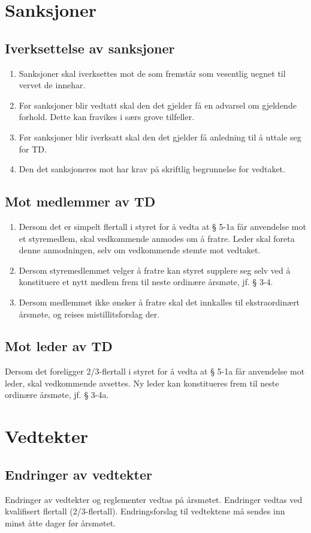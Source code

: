 \documentclass[11pt]{article}
\begin{document}
\section{Sanksjoner}
\subsection{Iverksettelse av sanksjoner}
\begin{enumerate}
	\item Sanksjoner skal iverksettes mot de som fremstår som vesentlig uegnet til vervet de innehar.
	\item Før sanksjoner blir vedtatt skal den det gjelder få en advarsel om gjeldende forhold. Dette kan fravikes i særs grove tilfeller.
	\item Før sanksjoner blir iverksatt skal den det gjelder få anledning til å uttale seg for TD.
	\item Den det sanksjoneres mot har krav på skriftlig begrunnelse for vedtaket.
\end{enumerate}

\subsection{Mot medlemmer av TD}
\begin{enumerate}
	\item Dersom det er simpelt flertall i styret for å vedta at § 5-1a får anvendelse mot et styremedlem, skal vedkommende anmodes om å fratre. Leder skal foreta denne anmodningen, selv om vedkommende stemte mot vedtaket.
	\item Dersom styremedlemmet velger å fratre kan styret supplere seg selv ved å konstituere et nytt medlem frem til neste ordinære årsmøte, jf. § 3-4.
	\item Dersom medlemmet ikke ønsker å fratre skal det innkalles til ekstraordinært årsmøte, og reises mistillitsforslag der.
\end{enumerate}

\subsection{Mot leder av TD}
Dersom det foreligger 2/3-flertall i styret for å vedta at § 5-1a får anvendelse mot leder, skal vedkommende avsettes. Ny leder kan konstitueres frem til neste ordinære årsmøte, jf. § 3-4a.

\section{Vedtekter}
\subsection{Endringer av vedtekter}
Endringer av vedtekter og reglementer vedtas på årsmøtet. Endringer vedtas ved kvalifisert flertall (2/3-flertall). Endringsforslag til vedtektene må sendes inn minst åtte dager før årsmøtet.
\end{document}
